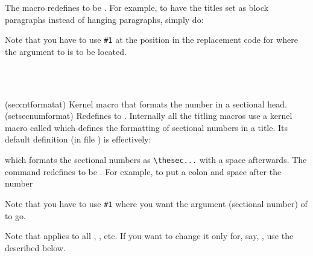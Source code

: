 The \cmd{\sethangfrom} macro redefines \cmd{\@hangfrom} to be .
For example, to have the titles set as block paragraphs instead of hanging
paragraphs, simply do:
\begin{lcode}
\end{lcode}
Note that you have to use \verb?#1? at the position in the replacement
code for \cmd{\@hangfrom} where the argument to \cmd{\@hangfrom}
is to be located.

\begin{syntax}
\cmd{\@seccntformat} \\
\cmd{\setsecnumformat} \\
\end{syntax}
\glossary(seccntformatat)%
  {}%
  {Kernel macro that formats the number in a sectional head.}
\glossary(setsecnumformat)%
  {}%
  {Redefines  to .}
Internally all the titling macros use a kernel macro called 
\cmd{\@seccntformat} 
which defines the formatting of sectional numbers in a title. Its
default definition (in file ) is effectively:
\begin{lcode}
\newcommand{\@seccntformat}[1]{\csname the#1\endcsname\quad}
\end{lcode}
which formats the sectional numbers as \verb?\thesec...? with a space 
afterwards.
The command \cmd{\setsecnumformat} redefines \cmd{\@seccntformat} 
to be .
For example, to put a colon and space after the number
\begin{lcode}
\end{lcode}
Note that you have to use \verb?#1? where you want the argument 
(sectional number) of \cmd{\@seccntformat} to go.

Note that \cmd{\setsecnumformat} applies to all \cmd{\section},
\cmd{\subsection}, etc. If you want to change it only for, say,
\cmd{\subsection}, use the \cmd{\setsubsechook} described below.


